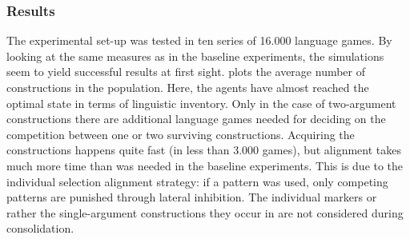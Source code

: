 \subsubsection{Results}
 The experimental set-up was tested in ten series of 16.000 language games. By looking at the same measures as in the baseline experiments, the simulations seem to yield successful results at first sight.  plots the average number of constructions in the population. Here, the agents have almost reached the optimal state in terms of linguistic inventory. Only in the case of two-argument constructions there are additional language games needed for deciding on the competition between one or two surviving constructions. Acquiring the constructions happens quite fast (in less than 3.000 games), but alignment takes much more time than was needed in the baseline experiments. This is due to the individual selection alignment strategy: if a pattern was used, only competing patterns are punished through lateral inhibition. The individual markers or rather the single-argument constructions they occur in are not considered during consolidation.

